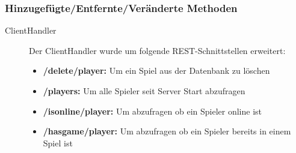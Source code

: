 \documentclass[parskip=full]{scrartcl}
\begin{document}
		\subsubsection{Hinzugefügte/Entfernte/Veränderte Methoden}
		\begin{description}
			\item[ClientHandler] Der ClientHandler wurde um folgende REST-Schnittstellen erweitert:
			\begin{itemize}
				\item \textbf{/delete/player:} Um ein Spiel aus der Datenbank zu löschen
				\item \textbf{/players:} Um alle Spieler seit Server Start abzufragen
				\item \textbf{/isonline/player:} Um abzufragen ob ein Spieler online ist
				\item \textbf{/hasgame/player:} Um abzufragen ob ein Spieler bereits in einem Spiel ist
			\end{itemize}
		\end{description}
\end{document}
